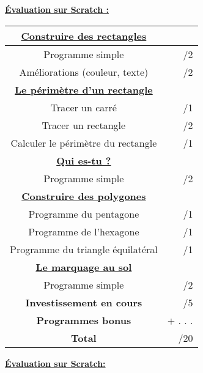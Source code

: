 \documentclass[a4paper,11pt]{article}
\begin{document}
\begin{flushright}
\textbf{\underline{Évaluation sur Scratch : } }\\


\renewcommand{\arraystretch}{1.5} %
\setlength{\tabcolsep}{1.5cm} %

\begin{tabular}{|c|r|}
\hline 
\textbf{\underline{Construire des rectangles}} &  \\ 
\hline 
Programme simple & /2 \\ 
\hline 
Améliorations (couleur, texte) & /2 \\ 
\hline 
\textbf{\underline{Le périmètre d'un rectangle}} &  \\ 
\hline 
Tracer un carré & /1 \\ 
\hline 
Tracer un rectangle & /2 \\ 
\hline 
Calculer le périmètre du rectangle & /1 \\ 
\hline
\textbf{\underline{Qui es-tu ?}} &  \\ 
\hline 
Programme simple & /2 \\ 
\hline 
\textbf{\underline{Construire des polygones}} & \\ 
\hline 
Programme du pentagone & /1 \\ 
\hline 
Programme de l'hexagone & /1 \\ 
\hline 
Programme du triangle équilatéral & /1 \\ 
\hline 
\textbf{\underline{Le marquage au sol}} &  \\ 
\hline 
Programme simple & /2 \\ 
\hline 
\textbf{Investissement en cours} & /5 \\ 
\hline 
\textbf{Programmes bonus} & + . . . \\ 
\hline 
\textbf{Total} & /20\\ 
\hline 

\end{tabular} 

\end{flushright}
\textbf{\underline{Évaluation sur Scratch: } }\\


\renewcommand{\arraystretch}{1.5} %
\setlength{\tabcolsep}{1.5cm} %
\end{document}
